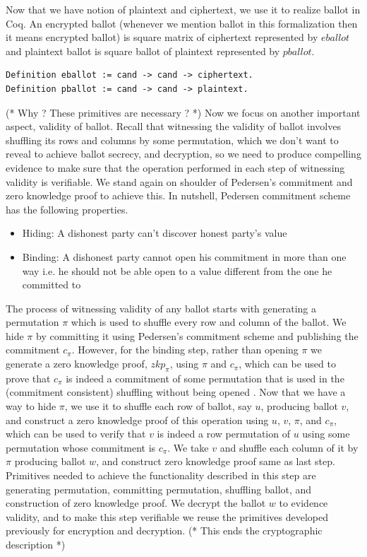 \documentclass{llncs}
\begin{document}
Now that we have notion of plaintext and ciphertext, we use it to realize 
ballot in Coq. An encrypted ballot (whenever we mention ballot in this formalization
then it means encrypted ballot) is square matrix of ciphertext represented 
by $eballot$ and plaintext ballot is square ballot of plaintext represented 
by $pballot$. 
\begin{lstlisting}[frame=single,basicstyle=\ttfamily\footnotesize]
Definition eballot := cand -> cand -> ciphertext.
Definition pballot := cand -> cand -> plaintext.
\end{lstlisting}

(* Why ? These primitives are necessary ? *)
Now we focus on another important aspect, validity of 
ballot. Recall that witnessing 
the validity of ballot involves shuffling its rows and columns 
by some permutation, which
we don't want to reveal to achieve ballot secrecy, and decryption, so 
we need to produce compelling evidence 
to make sure that the operation performed in each step of witnessing validity 
is verifiable. We stand again on shoulder of Pedersen's 
commitment \cite{Pederson} and zero knowledge proof to achieve this.
In nutshell, Pedersen commitment scheme has 
the following properties. 
\begin{itemize}
\item Hiding: A dishonest party can't discover honest party's value 
\item Binding: A dishonest party cannot open his commitment in more  
	 	than one way i.e. he should not be able open to a value 
	 	different from the one he committed to 
\end{itemize}


The process of witnessing validity of any ballot starts with generating a 
permutation $\pi$ which is used to shuffle every row and column of the ballot.
We hide $\pi$ by committing it using Pedersen's 
commitment scheme 
and publishing  the commitment $c_{\pi}$. However, for the binding step, rather 
than opening $\pi$ we generate a zero knowledge proof, $zkp_{\pi}$, 
using $\pi$ and $c_{\pi}$, which can 
be  used to prove that $c_{\pi}$ is indeed a commitment of some permutation
that is used in the (commitment consistent) shuffling 
 without being opened \cite{Wikstrom:2009:CPS}. Now that we have a way 
 to hide $\pi$, we use it to shuffle each row of 
ballot, say $u$, producing ballot $v$, and construct a zero knowledge proof 
of this operation using $u$, $v$, $\pi$, and $c_{\pi}$, which can be used 
to verify that $v$ is indeed a row permutation of $u$ using some permutation 
whose commitment is $c_{\pi}$. We take $v$ and shuffle each column of it 
by $\pi$ producing ballot $w$, and construct zero knowledge proof same 
as last step.   
Primitives needed to achieve the functionality described in this step  
are generating permutation, committing permutation,  shuffling ballot, 
and construction of zero knowledge proof.
We decrypt the ballot $w$ to evidence validity, and to make this step
 verifiable we reuse the primitives developed previously for
 encryption and decryption.
(* This ends the cryptographic description *)
\end{document}
